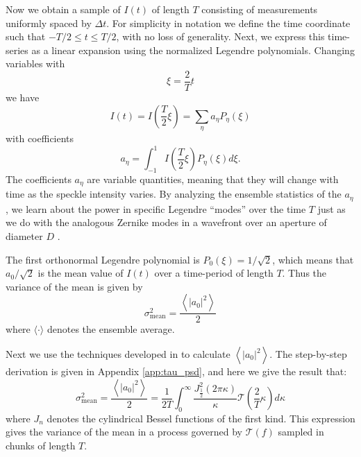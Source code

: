\documentclass[10pt,preprint]{aastex631}
\begin{document}
Now we obtain a sample of $I(t)$ of length $T$ consisting of measurements uniformly spaced by $\Delta t$.  For simplicity in notation we define the time coordinate such that $-T/2 \le t \le T/2$, with no loss of generality.  Next, we express this time-series as a linear expansion using the normalized Legendre polynomials.  Changing variables with
\begin{equation}
\xi = \frac{2}{T}t
\end{equation}
we have
\begin{equation}
I(t) = I\left(\frac{T}{2}\xi\right) = \sum_\eta a_\eta P_\eta(\xi)
\label{eqn:basisexpansion}
\end{equation}
with coefficients
\begin{equation}
a_\eta = \int_{-1}^{1} I\left(\frac{T}{2}\xi\right)P_\eta(\xi) d\xi.
\label{eqn:expansecoeff}
\end{equation}
The coefficients $a_\eta$ are variable quantities, meaning that they will change with time as the speckle intensity varies.  By analyzing the ensemble statistics of the $a_\eta$, we learn about the power in specific Legendre ``modes'' over the time $T$ just as we do with the analogous Zernike modes in a wavefront over an aperture of diameter $D$ \citep{1976JOSA...66..207N}.

The first orthonormal Legendre polynomial is $P_0(\xi) = 1/\sqrt{2}$, which means that $a_0/\sqrt{2}$ is the mean value of $I(t)$ over a time-period of length $T$.  Thus the variance of the mean is given by
\begin{equation}
\sigma_\mathrm{mean}^2 = \frac{\left\langle \left|a_0\right|^2 \right\rangle}{2}
\label{eqn:varmean_def}
\end{equation}
where $\langle \cdot \rangle$ denotes the ensemble average.   

Next we use the techniques developed in \citet{1976JOSA...66..207N} to calculate $\left\langle \left|a_0\right|^2 \right\rangle$. The step-by-step derivation is given in Appendix \ref{app:tau_psd}, and here we give the result that:
\begin{equation}
\sigma_\mathrm{mean}^2 = \frac{\left\langle \left|a_0\right|^2 \right\rangle}{2} = \frac{1}{2T}  \int_0^{\infty} \frac{ J_{\frac{1}{2}}^2(2\pi \kappa)}{\kappa} \mathcal{T}\left( \frac{2}{T} \kappa \right) d\kappa
\label{eqn:varmean}
\end{equation}
where $J_n$ denotes the cylindrical Bessel functions of the first kind.  This expression gives the variance of the mean in a process governed by $\mathcal{T}(f)$ sampled in chunks of length $T$.
\end{document}
